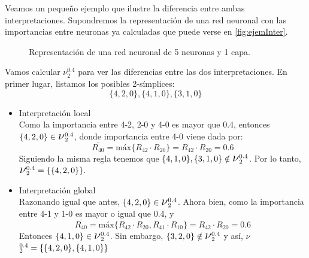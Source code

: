 \documentclass[12pt, a4paper, twoside]{book}
\numberwithin{equation}{section}
\theoremstyle{definition}
\newenvironment{ejem}
  {\pushQED{\qed}\renewcommand{\qedsymbol}{$\blacktriangleleft$}\ejemplo}
  {\popQED\endejemplo}
\theoremstyle{remark}
\theoremstyle{plain}
\begin{document}
	Veamos un pequeño ejemplo que ilustre la diferencia entre ambas 
	interpretaciones.
	\begin{ejem}
		\label{ej:int}
		Supondremos la representación de una red neuronal con 
		las importancias entre neuronas ya calculadas que puede verse 
		en \autoref{fig:ejemInter}.

		\begin{figure}[!htbp]
			\centering
			\caption{Representación de una red neuronal de 5 neuronas y 1 capa.}
			\label{fig:ejemInter}
		\end{figure}
		Vamos calcular {\Large $\nu$}$^{0.4}_{2}$ para ver las 
		diferencias entre las dos interpretaciones. En primer lugar, 
		listamos los posibles 2-símplices: 
		$$
		\{4,2,0\},\{4,1,0\},\{3,1,0\}
		$$
		\begin{itemize}
			\item{Interpretación local}\\
				Como la importancia entre 4-2, 2-0 y 4-0 es 
				mayor que 0.4, entonces $\{4,2,0\} \in 
				\text{{\Large $\nu$}}^{0.4}_{2}$,
				donde importancia entre 4-0 viene dada por:
				$$\overline{R_{40}}=\text{máx}\{R_{42} \cdot 
				R_{20}\}=R_{42} \cdot R_{20}=0.6$$
				Siguiendo la misma regla tenemos que 
				$\{4,1,0\},\{3,1,0\} \notin 
				\text{{\Large $\nu$}}^{0.4}_{2}$. Por lo 
				tanto,
				$\text{{\Large $\nu$}}^{0.4}_{2}=
				\{\{4,2,0\}\}$.
			\item{Interpretación global}\\
				Razonando igual que antes,$\ \{4,2,0\} \in 
				\text{{\Large $\nu$}}^{0.4}_{2}$. Ahora bien, 
				como la importancia entre 4-1 y 1-0 es mayor o 
				igual que 0.4, y 
				$$\overline{R_{40}}=\text{máx}\{R_{42} \cdot 
				R_{20},R_{41} \cdot R_{10}\}=R_{42} \cdot 
				R_{20}=0.6$$ 
				Entonces $\{4,1,0\} \in 
				\text{{\Large $\nu$}}^{0.4}_{2}$. Sin embargo, 
				$\{3,2,0\} \notin 
				\text{{\Large $\nu$}}^{0.4}_{2}$ y así, 
				{\Large $\nu$}$^{0.4}_{2}=\{\{4,2,0\},\\  
				\{4,1,0\}\}$
		\end{itemize}
	\end{ejem}
\end{document}
